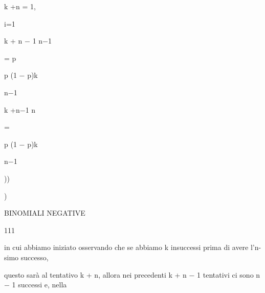 \documentclass[a4paper,portrait,12pt]{article}
\begin{document}
\begin{flushleft}
k +n = 1,
\end{flushleft}


\begin{flushleft}
i=1
\end{flushleft}





\begin{flushleft}
k + n $-$ 1 n$-$1
\end{flushleft}


\begin{flushleft}
= p
\end{flushleft}


\begin{flushleft}
p (1 $-$ p)k
\end{flushleft}


\begin{flushleft}
n$-$1
\end{flushleft}


\begin{flushleft}
k +n$-$1 n
\end{flushleft}


=


\begin{flushleft}
p (1 $-$ p)k
\end{flushleft}


\begin{flushleft}
n$-$1
\end{flushleft}





))


)





\begin{flushleft}
 BINOMIALI NEGATIVE
\end{flushleft}





111





\begin{flushleft}
in cui abbiamo iniziato osservando che se abbiamo k insuccessi prima di avere l'n-simo successo,
\end{flushleft}


\begin{flushleft}
questo sar\`{a} al tentativo k + n, allora nei precedenti k + n $-$ 1 tentativi ci sono n $-$ 1 successi e, nella
\end{flushleft}
\end{document}
